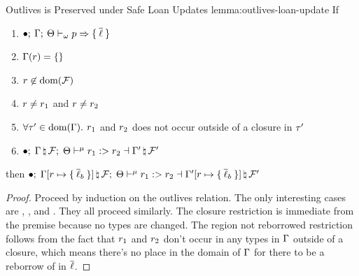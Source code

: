 \begin{oxlemma}{Outlives is Preserved under Safe Loan Updates}
  {lemma:outlives-loan-update} If
  \begin{enumerate}
  \item $\bullet; \: \Gamma; \: \Theta \vdash_{\omega} p \Rightarrow 
    \{ \: \overline{\ell} \: \} $
  \item $\Gamma(r) = \{\}$
  \item $r \not \in \textrm{dom}(\mathcal{F})$
  \item $r \not = r_1$ and $r \not = r_2$
  \item $\forall \tau^\prime \in \textrm{dom}(\Gamma).$ $r_1$ and
    $r_2$ does not occur outside of a closure in $\tau^\prime$
  \item $\bullet; \; 
    \Gamma \, \natural \, \mathcal{F}
  ; \; \Theta \vdash^{\mu} r_1 :> r_2 \dashv 
    \Gamma^\prime \, \natural \, \mathcal{F}^\prime
 $
  \end{enumerate}
  then
  $\bullet; \; 
    \Gamma[r \mapsto \{ \: \overline{\ell}_b \: \}] \, \natural \, \mathcal{F}
  ; \; \Theta \vdash^{\mu} r_1 :> r_2 \dashv 
    \Gamma^{\prime}[r \mapsto \{ \: \overline{\ell}_b \: \}] \, \natural \, \mathcal{F}^{\prime}
 $
\end{oxlemma}

\begin{proof}
  Proceed by induction on the outlives relation. The only interesting cases are
  , , and
  . They all proceed similarly. The closure restriction
  is immediate from the premise because no types are changed. The region not
  reborrowed restriction follows from the fact that $r_1$ and
  $r_2$ don't occur in any types in $\Gamma$ outside of a closure,
  which means there's no place in the domain of $\Gamma$ for there to be a
  reborrow of in $\overline{\ell}$.
\end{proof}

